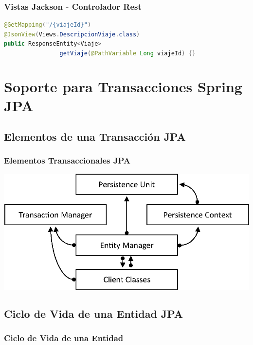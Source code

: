 \documentclass[a4paper,slidestop,xcolor=pst,blue]{beamer}
\begin{document}
\begin{frame}[c,fragile]
    \frametitle{Vistas Jackson - Controlador Rest}
\begin{lstlisting}[basicstyle=\small,language=Java]
@GetMapping("/{viajeId}")
@JsonView(Views.DescripcionViaje.class)
public ResponseEntity<Viaje>
                getViaje(@PathVariable Long viajeId) {}
\end{lstlisting}
\end{frame}

\section{Soporte para Transacciones Spring JPA}

\subsection{Elementos de una Transacción JPA}

\begin{frame}[c]
    \frametitle{Elementos Transaccionales JPA}
    \begin{center}
        \includegraphics[width=0.8\linewidth,keepaspectratio=true]{images/jpa/jpaElements.eps}
    \end{center}
\end{frame}

\subsection{Ciclo de Vida de una Entidad JPA}

\begin{frame}[c]
    \frametitle{Ciclo de Vida de una Entidad}
\end{frame}
\end{document}
